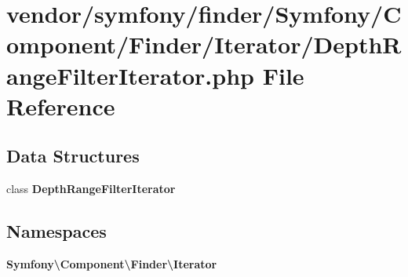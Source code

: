 \section{vendor/symfony/finder/\+Symfony/\+Component/\+Finder/\+Iterator/\+Depth\+Range\+Filter\+Iterator.php File Reference}
\label{_depth_range_filter_iterator_8php}
\subsection*{Data Structures}
\begin{DoxyCompactItemize}
\item 
class {\bf Depth\+Range\+Filter\+Iterator}
\end{DoxyCompactItemize}
\subsection*{Namespaces}
\begin{DoxyCompactItemize}
\item 
 {\bf Symfony\textbackslash{}\+Component\textbackslash{}\+Finder\textbackslash{}\+Iterator}
\end{DoxyCompactItemize}
